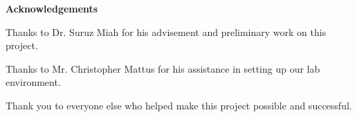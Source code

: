 
\begin{center}\textbf{Acknowledgements}\end{center}

    \par Thanks to Dr. Suruz Miah for his advisement and preliminary work on this project.
    \par Thanks to Mr. Christopher Mattus for his assistance in setting up our lab environment.
    \par Thank you to everyone else who helped make this project possible and successful.


\cleardoublepage



